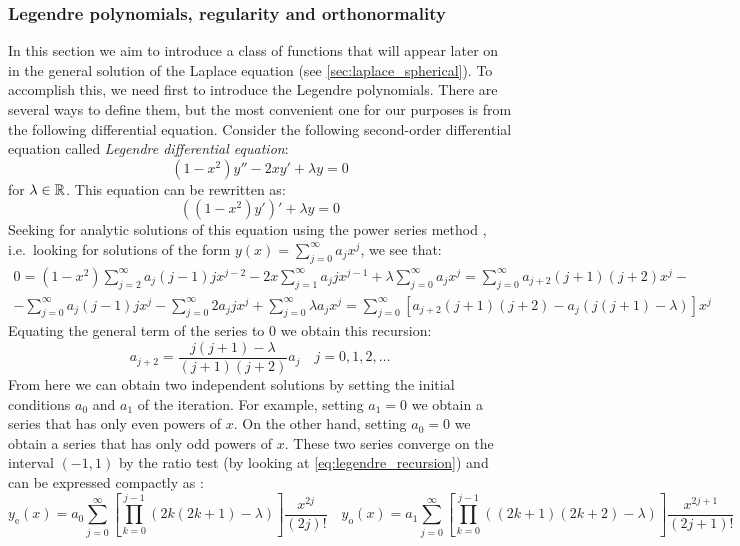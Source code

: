 \documentclass[../main.tex]{subfiles}
\begin{document}
\subsubsection{Legendre polynomials, regularity and orthonormality}
In this section we aim to introduce a class of functions that will appear later on in the general solution of the Laplace equation (see \cref{sec:laplace_spherical}). To accomplish this, we need first to introduce the Legendre polynomials. There are several ways to define them, but the most convenient one for our purposes is from the following differential equation. Consider the following second-order differential equation called \emph{Legendre differential equation}:
\begin{equation}
  (1-x^2)y''-2xy'+\lambda y=0
\end{equation}
for $\lambda\in\mathbb{R}$. This equation can be rewritten as:
\begin{equation}\label{eq:legendre_diff_eq}
  {((1-x^2)y')}'+\lambda  y=0
\end{equation}
Seeking for analytic solutions of this equation using the power series method \cite{florida:legendre}, i.e.\ looking for solutions of the form $y(x)=\sum_{j=0}^{\infty}a_jx^j$, we see that:
\begin{multline}
  0=(1-x^2)\sum_{j=2}^{\infty}a_{j}(j-1)jx^{j-2}-2x\sum_{j=1}^{\infty}a_{j}jx^{j-1}+\lambda\sum_{j=0}^{\infty}a_jx^j =\sum_{j=0}^{\infty}a_{j+2}(j+1)(j+2)x^j-\\-\sum_{j=0}^{\infty}a_{j}(j-1)jx^{j}-\sum_{j=0}^{\infty}2a_{j}jx^{j}+\sum_{j=0}^{\infty}\lambda a_jx^j  =\sum_{j=0}^{\infty}[a_{j+2}(j+1)(j+2) - a_j(j(j+1)-\lambda)]x^j
\end{multline}
Equating the general term of the series to 0 we obtain this recursion:
\begin{equation}\label{eq:legendre_recursion}
  a_{j+2}=\frac{j(j+1)-\lambda}{(j+1)(j+2)}a_j\quad j=0,1,2,\ldots
\end{equation}
From here we can obtain two independent solutions by setting the initial conditions $a_0$ and $a_1$ of the iteration. For example, setting $a_1=0$ we obtain a series that has only even powers of $x$. On the other hand, setting $a_0=0$ we obtain a series that has only odd powers of $x$. These two series converge on the interval $(-1,1)$ by the ratio test (by looking at \cref{eq:legendre_recursion}) and can be expressed compactly as \cite{florida:legendre}:
\begin{equation}\label{eq:legendre_series}
  y_\mathrm{e}(x)=a_0\sum_{j=0}^{\infty}\left[\prod_{k=0}^{j-1}(2k(2k+1)-\lambda)\right]\frac{x^{2j}}{(2j)!}\quad y_\mathrm{o}(x)=a_1\sum_{j=0}^{\infty}\left[\prod_{k=0}^{j-1}((2k+1)(2k+2)-\lambda)\right]\frac{x^{2j+1}}{(2j+1)!}
\end{equation}
\end{document}

